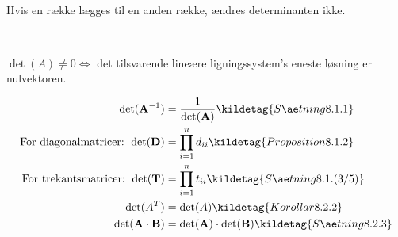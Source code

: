 
\

Hvis en række lægges til en anden række, ændres determinanten ikke.


\

$\det(A) \ne 0 \iff$ det tilsvarende lineære ligningssystem's eneste løsning er nulvektoren. 


\begin{align*}
    \det (\mathbf{A}^{-1} ) &= \frac{1}{\det(\mathbf{A})} \kildetag{Sætning 8.1.1} \\
    \text{For diagonalmatricer: } \det(\mathbf{D}) &= \prod_{i=1}^{n} d_{ii} \kildetag{Proposition 8.1.2} \\
    \text{For trekantsmatricer: } \det(\mathbf{T}) &= \prod_{i=1}^{n} t_{ii} \kildetag{Sætning 8.1.(3/5)} \\
    \det(A^T) &= \det(A) \kildetag{Korollar 8.2.2} \\
    \det (\mathbf{A} \cdot \mathbf{B}) &= \det(\mathbf{A}) \cdot \det(\mathbf{B}) \kildetag{Sætning 8.2.3}
\end{align*}